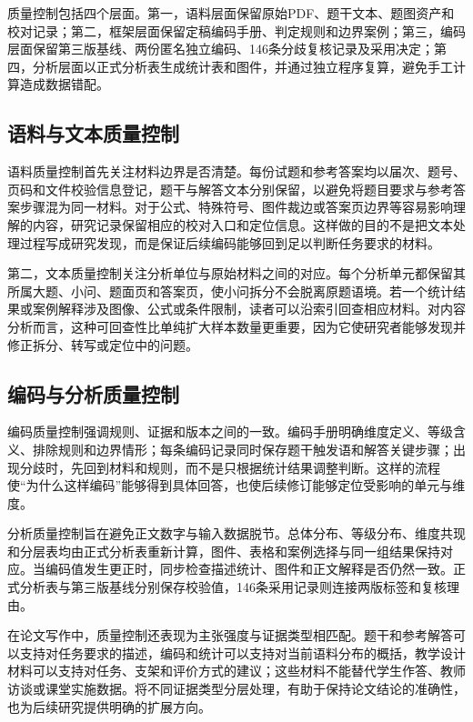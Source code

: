\documentclass[
  12pt,
  a4paper,twoside,openany]{ctexbook}
\begin{document}
质量控制包括四个层面。第一，语料层面保留原始PDF、题干文本、题图资产和校对记录；第二，框架层面保留定稿编码手册、判定规则和边界案例；第三，编码层面保留第三版基线、两份匿名独立编码、146条分歧复核记录及采用决定；第四，分析层面以正式分析表生成统计表和图件，并通过独立程序复算，避免手工计算造成数据错配。

\subsection{语料与文本质量控制}\label{ux8bedux6599ux4e0eux6587ux672cux8d28ux91cfux63a7ux5236}

语料质量控制首先关注材料边界是否清楚。每份试题和参考答案均以届次、题号、页码和文件校验信息登记，题干与解答文本分别保留，以避免将题目要求与参考答案步骤混为同一材料。对于公式、特殊符号、图件裁边或答案页边界等容易影响理解的内容，研究记录保留相应的校对入口和定位信息。这样做的目的不是把文本处理过程写成研究发现，而是保证后续编码能够回到足以判断任务要求的材料。

第二，文本质量控制关注分析单位与原始材料之间的对应。每个分析单元都保留其所属大题、小问、题面页和答案页，使小问拆分不会脱离原题语境。若一个统计结果或案例解释涉及图像、公式或条件限制，读者可以沿索引回查相应材料。对内容分析而言，这种可回查性比单纯扩大样本数量更重要，因为它使研究者能够发现并修正拆分、转写或定位中的问题。

\subsection{编码与分析质量控制}\label{ux7f16ux7801ux4e0eux5206ux6790ux8d28ux91cfux63a7ux5236}

编码质量控制强调规则、证据和版本之间的一致。编码手册明确维度定义、等级含义、排除规则和边界情形；每条编码记录同时保存题干触发语和解答关键步骤；出现分歧时，先回到材料和规则，而不是只根据统计结果调整判断。这样的流程使``为什么这样编码''能够得到具体回答，也使后续修订能够定位受影响的单元与维度。

分析质量控制旨在避免正文数字与输入数据脱节。总体分布、等级分布、维度共现和分层表均由正式分析表重新计算，图件、表格和案例选择与同一组结果保持对应。当编码值发生更正时，同步检查描述统计、图件和正文解释是否仍然一致。正式分析表与第三版基线分别保存校验值，146条采用记录则连接两版标签和复核理由。

在论文写作中，质量控制还表现为主张强度与证据类型相匹配。题干和参考解答可以支持对任务要求的描述，编码和统计可以支持对当前语料分布的概括，教学设计材料可以支持对任务、支架和评价方式的建议；这些材料不能替代学生作答、教师访谈或课堂实施数据。将不同证据类型分层处理，有助于保持论文结论的准确性，也为后续研究提供明确的扩展方向。
\end{document}
